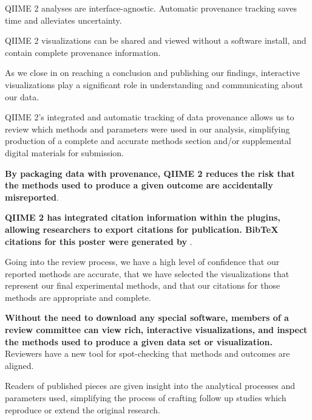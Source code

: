\documentclass[final]{beamer}
\newlength{\colwidth}
\begin{document}
\begin{frame}[t]
\begin{columns}[t]
\begin{column}{\colwidth}
\begin{block}{QIIME 2 analyses are interface-agnostic. Automatic provenance tracking saves time and alleviates uncertainty.}
  \end{block}

  \begin{block}{QIIME 2 visualizations can be shared and viewed without a software install, and contain complete provenance information.}

    As we close in on reaching a conclusion and publishing our findings,
    interactive visualizations play a significant role in understanding and
    communicating about our data. 

    QIIME 2’s integrated and automatic tracking of data provenance allows us
    to review which methods and parameters were used in our analysis,
    simplifying production of a complete and accurate methods section and/or
    supplemental digital materials for submission.

    \textbf{By packaging data with provenance, QIIME 2 reduces the risk that the
    methods used to produce a given outcome are accidentally misreported}.

    \textbf{QIIME 2 has integrated citation information within the plugins, allowing
    researchers to export citations for publication. BibTeX citations for this
    poster were generated by }.

    Going into the review process, we have a high level of confidence that our
    reported methods are accurate, that we have selected the visualizations
    that represent our final experimental methods, and that our citations for
    those methods are appropriate and complete.

    \textbf{Without the need to download any special software, members of a review
    committee can view rich, interactive visualizations, and inspect the
    methods used to produce a given data set or visualization.} Reviewers have
    a new tool for spot-checking that methods and outcomes are aligned.


    Readers of published pieces are given insight into the analytical
    processes and parameters used, simplifying the process of crafting follow
    up studies which reproduce or extend the original research.


\end{block}
\end{column}
\end{columns}
\end{frame}
\end{document}
